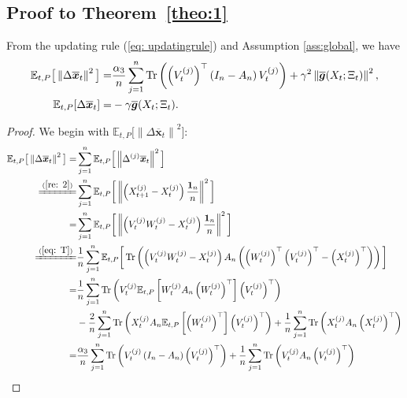 \subsection{Proof to Theorem~\ref{theo:1}}


\begin{lemma}\label{L:deltax}
From the updating rule (\ref{eq: updatingrule}) and Assumption \ref{ass:global}, we have
\begin{align*}
\mathbb{E}_{t,P}\big[\left\|\Delta\overline{\bm{x}}_t\right\|^2\big] = &\frac{\alpha_3}{n}\sum_{j=1}^n \operatorname{Tr}\left( \left(V_t^{(j)}\right)^{\top}\left(I_n-A_n\right)V_t^{(j)} \right) +  \gamma^2 \left\| \overline{\bm{g}}(X_t;\Xi_t) \right\|^2,\\
\mathbb{E}_{t,P}[\Delta\overline{\bm{x}}_t]= &-\gamma \overline{\bm{g}}(X_t; \Xi_t).
\end{align*}
\begin{proof}
We begin with $\mathbb{E}_{t,P}\big[\left\|\Delta\overline{\bm{x}}_t\right\|^2\big]$: 
\begin{align*}
\mathbb{E}_{t,P}\big[\left\|\Delta\overline{\bm{x}}_t\right\|^2\big] =&  \sum\limits_{j=1}^n \mathbb{E}_{t,P}\Big[\left\|\Delta^{(j)}\overline{\bm{x}}_t\right\|^2\Big]\\
\xlongequal{(\ref{re: 2})}& \sum_{j=1}^n\mathbb{E}_{t,P}\bigg[\left\| \left(X_{t+1}^{(j)} - X_{t}^{(j)}\right)\frac{\bm{1}_n}{n}\right\|^2\bigg]\\
=& \sum_{j=1}^n\mathbb{E}_{t,P} \bigg[\left\| \left(V_t^{(j)}W_t^{(j)} - X_{t}^{(j)}\right)\frac{\bm{1}_n}{n}\right\|^2\bigg]\\
\xlongequal{(\ref{eq: T})}& \frac{1}{n}\sum_{j=1}^n\mathbb{E}_{t,P} \bigg[\Tr\left( \left(V_t^{(j)}W_t^{(j)} - X_{t}^{(j)}\right) A_n \left( \left(W_t^{(j)}\right)^{\top}\left(V_t^{(j)}\right)^{\top} - \left(X_{t}^{(j)}\right)^{\top}\right)   \right)\bigg]\\
= & \frac{1}{n}\sum_{j=1}^n \Tr\left( V_t^{(j)}\mathbb{E}_{t,P}\left[ W_t^{(j)} A_n \left(W_t^{(j)}\right)^{\top}\right] \left(V_t^{(j)}\right)^{\top} \right)\\
& - \frac{2}{n}\sum_{j=1}^n \Tr\left( X_{t}^{(j)} A_n\mathbb{E}_{t,P}\left[\left(W_t^{(j)}\right)^{\top}\right] \left(V_t^{(j)}\right)^{\top} \right) + \frac{1}{n}\sum_{j=1}^n \Tr\left( X_{t}^{(j)} A_n \left(X_{t}^{(j)}\right)^{\top}\right)\\
= & \frac{\alpha_3}{n}\sum_{j=1}^n \Tr\left( V_t^{(j)}\left(I_n-A_n\right)\left(V_t^{(j)}\right)^{\top} \right) + \frac{1}{n}\sum_{j=1}^n \Tr\left( V_t^{(j)} A_n \left(V_t^{(j)}\right)^{\top}  \right)\\ 

\end{align*}
\end{proof}
\end{lemma}

